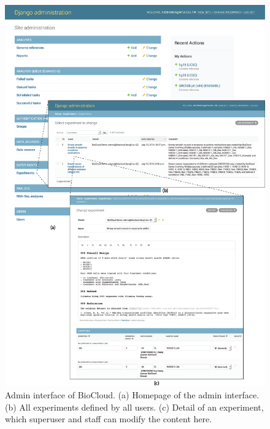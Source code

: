 \begin{figure}[!p]
\centering
\includegraphics[width=1\textwidth]{images/biocloud_admin}
\caption[Admin interface of BioCloud]{
    Admin interface of BioCloud.
    (a) Homepage of the admin interface.
    (b) All experiments defined by all users.
    (c) Detail of an experiment, which superuser and staff can modify the
        content here.
}
\label{fig:biocloud-admin}
\end{figure}


